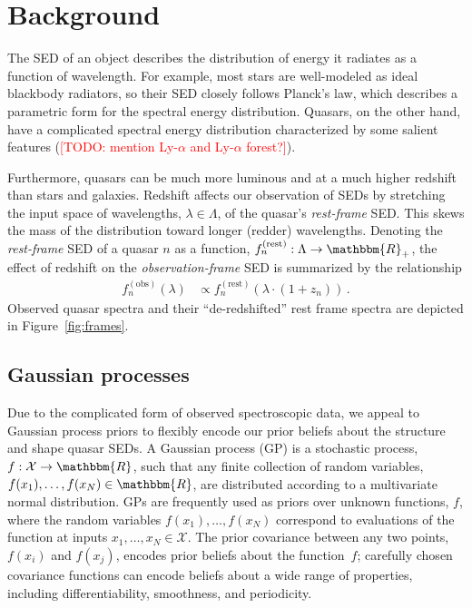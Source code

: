 \documentclass{article}
\newcommand{\R}{\mathbbm{R}}
\newcommand{\mcX}{\mathcal{X}}
\newcommand{\red}[1]{\textcolor{red}{[TODO: #1]}}
\begin{document}
\section{Background}
\label{sec:background}
The SED of an object describes the distribution of energy it radiates as a function of wavelength.  
For example, most stars are well-modeled as ideal blackbody radiators, so their SED closely follows Planck's law, which describes a parametric form for the spectral energy distribution. 
Quasars, on the other hand, have a complicated spectral energy distribution characterized by some salient features (\red{mention Ly-$\alpha$ and Ly-$\alpha$ forest?}).

Furthermore, quasars can be much more luminous and at a much higher redshift than stars and galaxies.  
Redshift affects our observation of SEDs by stretching the input space of wavelengths, $\lambda \in \Lambda$, of the quasar's \emph{rest-frame} SED.  
This skews the mass of the distribution toward longer (redder) wavelengths. Denoting the \emph{rest-frame} SED of a quasar $n$ as a function, $f_n^{(\text{rest})} : \Lambda \rightarrow \R_+$, the effect of redshift on the \emph{observation-frame} SED is summarized by the relationship 
\begin{align}
  f_n^{(\text{obs})}(\lambda) &\propto f_n^{(\text{rest})}(\lambda \cdot (1 + z_n)) \, .
\end{align}
Observed quasar spectra and their ``de-redshifted'' rest frame spectra are depicted in Figure~\ref{fig:frames}.

\subsection{Gaussian processes}
Due to the complicated form of observed spectroscopic data, we appeal to Gaussian process priors to flexibly encode our prior beliefs about the structure and shape quasar SEDs. 
A Gaussian process (GP) is a stochastic process, $f: \mathcal{X} \rightarrow \R$, such that any finite collection of random variables, ${f(x_1),\dots, f(x_N) \in \R}$, are distributed according to a multivariate normal distribution.  
GPs are frequently used as priors over unknown functions, $f$, where the random variables $f(x_1), \dots, f(x_N)$ correspond to evaluations of the function at inputs $x_1, \dots, x_N \in \mcX$.  
The prior covariance between any two points, $f(x_i)$ and $f(x_j)$, encodes prior beliefs about the function~$f$; carefully chosen covariance functions can encode beliefs about a wide range of properties, including differentiability, smoothness, and periodicity.  
\end{document}
